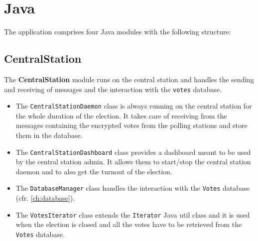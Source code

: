 %
\chapter{Java}\label{ch:java}
The application comprises four Java modules with the following structure:
\hfill \break
{}
\pagebreak
\section*{CentralStation}\label{sec:centralstation}
The \textbf{CentralStation} module runs on the central station and handles the sending and receiving of messages and the interaction with the \texttt{votes} database.\\
\begin{itemize}
	\item The \texttt{CentralStationDaemon} class is always running on the central station for the whole duration of the election. It takes care of receiving from the messages containing the encrypted votes from the polling stations and store them in the database.
	\item The \texttt{CentralStationDashboard} class provides a dashboard meant to be used by the central station admin. It allows them to start/stop the central station daemon and to also get the turnout of the election.
	\item The \texttt{DatabaseManager} class handles the interaction with the \texttt{Votes} database (cfr. \ref{ch:database}).\\
	\item The \texttt{VotesIterator} class extends the \texttt{Iterator} Java util class and it is used when the election is closed and all the votes have to be retrieved from the \texttt{Votes} database.\\
\end{itemize}

